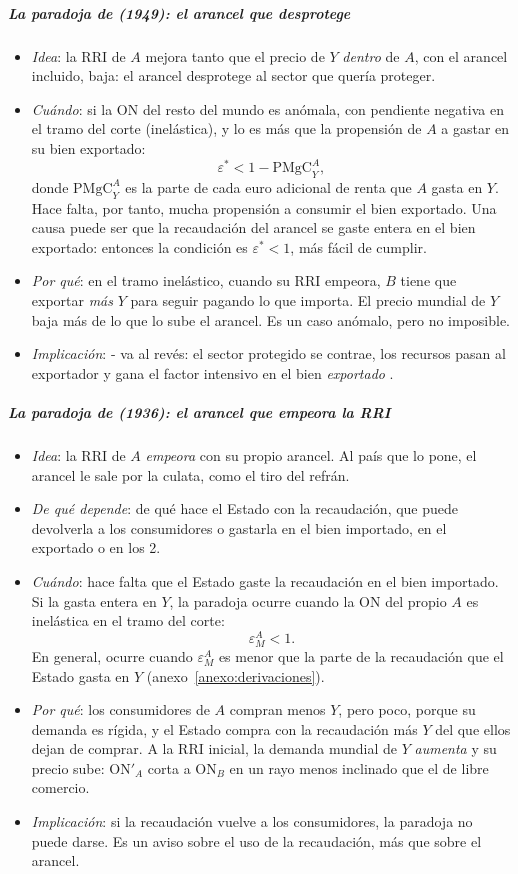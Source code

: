\documentclass[11pt]{article}
\begin{document}
\subparagraph{La paradoja de  (1949): el arancel que desprotege}

\begin{itemize}
\item \emph{Idea}: la RRI de $A$ mejora tanto que el precio de $Y$ \emph{dentro} de $A$, con el arancel incluido, baja: el arancel desprotege al sector que quería proteger\nocite{Metzler1949Tariffs}.
\item \emph{Cuándo}: si la ON del resto del mundo es anómala, con pendiente negativa en el tramo del corte (inelástica), y lo es más que la propensión de $A$ a gastar en su bien exportado:
  \[
  \varepsilon^*<1-\mathrm{PMgC}^A_Y,
  \]
  donde $\mathrm{PMgC}^A_Y$ es la parte de cada euro adicional de renta que $A$ gasta en $Y$. Hace falta, por tanto, mucha propensión a consumir el bien exportado. Una causa puede ser que la recaudación del arancel se gaste entera en el bien exportado: entonces la condición es $\varepsilon^*<1$, más fácil de cumplir.
\item \emph{Por qué}: en el tramo inelástico, cuando su RRI empeora, $B$ tiene que exportar \emph{más} $Y$ para seguir pagando lo que importa. El precio mundial de $Y$ baja más de lo que lo sube el arancel. Es un caso anómalo, pero no imposible.
\item \emph{Implicación}: - va al revés: el sector protegido se contrae, los recursos pasan al exportador y gana el factor intensivo en el bien \emph{exportado} .
\end{itemize}

\subparagraph{La paradoja de  (1936): el arancel que empeora la RRI}

\begin{itemize}
\item \emph{Idea}: la RRI de $A$ \emph{empeora} con su propio arancel. Al país que lo pone, el arancel le sale por la culata, como el tiro del refrán.
\item \emph{De qué depende}: de qué hace el Estado con la recaudación, que puede devolverla a los consumidores o gastarla en el bien importado, en el exportado o en los 2.
\item \emph{Cuándo}: hace falta que el Estado gaste la recaudación en el bien importado. Si la gasta entera en $Y$, la paradoja ocurre cuando la ON del propio $A$ es inelástica en el tramo del corte:
  \[
  \varepsilon^A_M<1.
  \]
  En general, ocurre cuando $\varepsilon^A_M$ es menor que la parte de la recaudación que el Estado gasta en $Y$ (anexo~\ref{anexo:derivaciones}).
\item \emph{Por qué}: los consumidores de $A$ compran menos $Y$, pero poco, porque su demanda es rígida, y el Estado compra con la recaudación más $Y$ del que ellos dejan de comprar. A la RRI inicial, la demanda mundial de $Y$ \emph{aumenta} y su precio sube: ON$'_A$ corta a ON$_B$ en un rayo menos inclinado que el de libre comercio.
\item \emph{Implicación}: si la recaudación vuelve a los consumidores, la paradoja no puede darse. Es un aviso sobre el uso de la recaudación, más que sobre el arancel.
\end{itemize}
\end{document}
